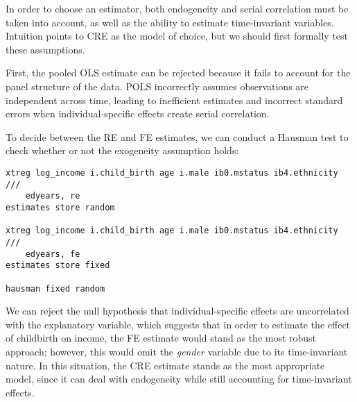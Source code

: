 


In order to choose an estimator, both endogeneity and serial correlation must be taken into account, as well as the ability to estimate time-invariant variables. Intuition points to CRE as the model of choice, but we should first formally test these assumptions.

First, the pooled OLS estimate can be rejected because it fails to account for the panel structure of the data. POLS incorrectly assumes observations are independent across time, leading to inefficient estimates and incorrect standard errors when individual-specific effects create serial correlation.

To decide between the RE and FE estimates, we can conduct a Hausman test to check whether or not the exogeneity assumption holds:

\begin{verbatim}
xtreg log_income i.child_birth age i.male ib0.mstatus ib4.ethnicity ///
    edyears, re
estimates store random

xtreg log_income i.child_birth age i.male ib0.mstatus ib4.ethnicity ///
    edyears, fe
estimates store fixed

hausman fixed random
\end{verbatim}


We can reject the null hypothesis that individual-specific effects are uncorrelated with the explanatory variable, which suggests that in order to estimate the effect of childbirth on income, the FE estimate would stand as the most robust approach; however, this would omit the \emph{gender} variable due to its time-invariant nature. In this situation, the CRE estimate stands as the most appropriate model, since it can deal with endogeneity while still accounting for time-invariant effects.

